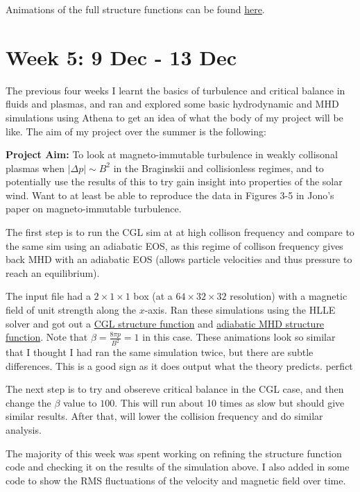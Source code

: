 \documentclass[12pt,letterpaper]{article}
\begin{document}
  Animations of the full structure functions can be found \href{https://github.com/JohnstonZade/python_tools/tree/master/animate}{here}.

  \newpage
  \section*{Week 5: 9 Dec - 13 Dec}

  The previous four weeks I learnt the basics of turbulence and critical balance in fluids and plasmas, and ran and explored some basic hydrodynamic and MHD simulations using Athena to get an idea of what the body of my project will be like. The aim of my project over the summer is the following:

  \textbf{Project Aim:} To look at magneto-immutable turbulence in weakly collisonal plasmas when $|\Delta p|\sim B^2$ in the Braginskii and collisionless regimes, and to potentially use the results of this to try gain insight into properties of the solar wind. Want to at least be able to reproduce the data in Figures 3-5 in Jono's paper on magneto-immutable turbulence.

  The first step is to run the CGL sim at at high collison frequency and compare to the same sim using an adiabatic EOS, as this regime of collison frequency gives back MHD with an adiabatic EOS (allows particle velocities and thus pressure to reach an equilibrium).

  The input file had a $2\times 1\times 1$ box (at a $64\times 32\times 32$ resolution) with a magnetic field of unit strength along the $x$-axis. Ran these simulations using the HLLE solver and got out a \href{https://github.com/JohnstonZade/python_tools/blob/master/animate/cgl_cont_turb_6432.gif}{CGL structure function} and \href{https://github.com/JohnstonZade/python_tools/blob/master/animate/mhd_cont_turb_6432.gif}{adiabatic MHD structure function}. Note that $\beta = \frac{8\pi p}{B^2} = 1$ in this case. These animations look so similar that I thought I had ran the same simulation twice, but there are subtle differences. This is a good sign as it does output what the theory predicts. perfict

  The next step is to try and obsereve critical balance in the CGL case, and then change the $\beta$ value to $100$. This will run about 10 times as slow but should give similar results. After that, will lower the collision frequency and do similar analysis.

  The majority of this week was spent working on refining the structure function code and checking it on the results of the simulation above. I also added in some code to show the RMS fluctuations of the velocity and magnetic field over time.
\end{document}

